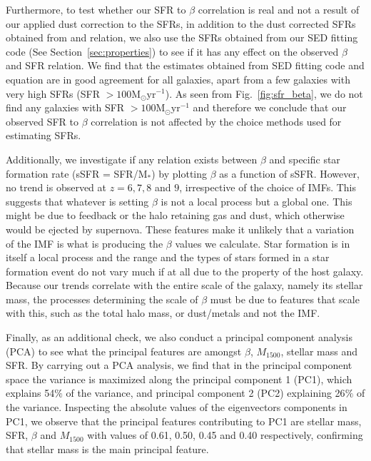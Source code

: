 \documentclass[twocolumn]{aastex63}
\begin{document}
Furthermore, to test whether our SFR to $\beta$ correlation is real and not a result of our applied dust correction to the SFRs, in addition to the dust corrected SFRs obtained from \citet{Kennicutt1998} and \citet{Meurer1999} relation, we also use the SFRs obtained from our SED fitting code (See Section~\ref{sec:properties}) to see if it has any effect on the observed $\beta$ and SFR relation. We find that the estimates obtained from SED fitting code and \citet{Kennicutt1998} equation are in good agreement for all galaxies, apart from a few galaxies with very high SFRs (SFR $>100\mathrm{M_{\odot}yr^{-1}}$). As seen from Fig.~\ref{fig:sfr_beta}, we do not find any galaxies with SFR $>100\mathrm{M_{\odot}yr^{-1}}$ and therefore we conclude that our observed SFR to $\beta$ correlation is not affected by the choice methods used for estimating SFRs.

Additionally, we investigate if any relation exists between $\beta$ and specific star formation rate (sSFR = SFR/M$_{*}$) by plotting $\beta$ as a function of sSFR. However, no trend is observed at $z=6,7,8$ and $9$, irrespective of the choice of IMFs. This suggests that whatever is setting $\beta$ is not a local process but a global one. This might be due to feedback or the halo retaining gas and dust, which otherwise would be ejected by supernova. These features make it unlikely that a variation of the IMF is what is producing the $\beta$ values we calculate. Star formation is in itself a local process and the range and the types of stars formed in a star formation event do not vary much if at all due to the property of the host galaxy. Because our trends correlate with the entire scale of the galaxy, namely its stellar mass, the processes determining the scale of $\beta$ must be due to features that scale with this, such as the total halo mass, or dust/metals and not the IMF.

Finally, as an additional check, we also conduct a principal component analysis (PCA) to see what the principal features are amongst $\beta$, $M_{1500}$, stellar mass and SFR. By carrying out a PCA analysis, we find that in the principal component space the variance is maximized along the principal component 1 (PC1), which explains 54$\%$ of the variance, and principal component 2 (PC2) explaining 26$\%$ of the variance. Inspecting the absolute values of the eigenvectors components in PC1, we observe that the principal features contributing to PC1 are stellar mass, SFR, $\beta$ and $M_{1500}$ with values of 0.61, 0.50, 0.45 and 0.40 respectively, confirming that stellar mass is the main principal feature.
\end{document}
